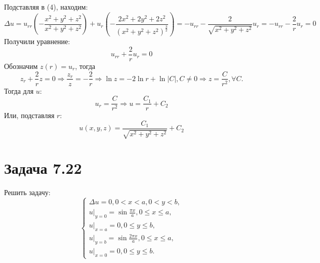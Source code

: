 \documentclass[11pt]{article}
\begin{document}
Подставляя в (4), находим:
\begin{equation*}
\Delta u = u_{rr}\left(-\frac{x^2 + y^2 + z^2}{x^2 + y^2 + z^2}\right) +
u_r\left(-\frac{2x^2 + 2y^2 + 2z^2}{(x^2 + y^2 + z^2)^{\frac32}}\right) = 
-u_{rr} - \frac2{\sqrt{x^2 + y^2 + z^2}}u_r = -u_{rr} - \frac2ru_r = 0
\end{equation*}
Получили уравнение:
\begin{equation}
u_{rr} + \frac2ru_r = 0
\end{equation}
Обозначим $z(r) = u_r$, тогда
\begin{equation*}
z_r + \frac2rz = 0 \Rightarrow \frac{z_r}z = -\frac2r \Rightarrow \ln z = -2\ln r + \ln |C|, C \neq 0
\Rightarrow z = \frac{C}{r^2}, \forall C.
\end{equation*}
Тогда для $u$:
\begin{equation*}
u_r = \frac{C}{r^2} \Rightarrow u = \frac{C_1}r + C_2
\end{equation*}
Или, подставляя $r$:
\begin{equation}
u(x, y, z) = \frac{C_1}{\sqrt{x^2 + y^2 + z^2}} + C_2
\end{equation}
\section{Задача 7.22}
\label{sec:orga26c010}
Решить задачу:
\begin{equation}
\begin{cases}
\Delta u = 0, 0 < x < a, 0 < y < b, \\
u|_{y = 0} = \sin\frac{\pi x}a, 0 \leq x \leq a, \\
u|_{x = a} = 0, 0 \leq y \leq b, \\
u|_{y = b} = \sin\frac{2\pi x}a, 0 \leq x \leq a, \\
u|_{x = 0} = 0, 0 \leq y \leq b.
\end{cases}
\end{equation}
\end{document}
